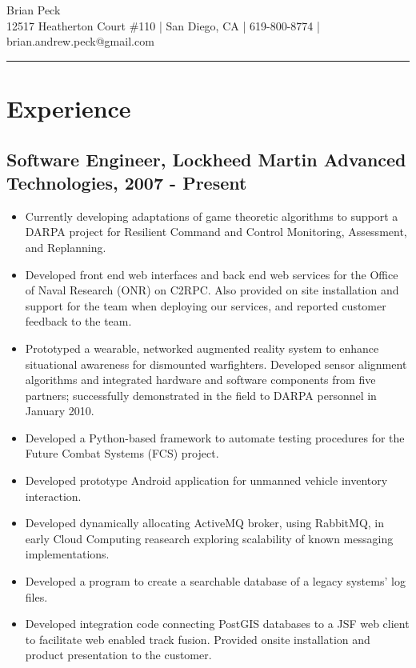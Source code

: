\documentclass[11pt]{article}
\title{}
\date{}
\begin{document}
\begin{center}
{\huge Brian Peck} \\
12517 Heatherton Court \#110 | San Diego, CA | 619-800-8774 | brian.andrew.peck@gmail.com
\hrule
\end{center}

\section*{Experience}
\label{sec-1}

\subsection*{Software Engineer, Lockheed Martin Advanced Technologies, 2007 - Present}
\label{sec-1.1}

\begin{itemize}
\item Currently developing adaptations of game theoretic algorithms to support a DARPA project for Resilient Command and Control Monitoring, Assessment, and Replanning.
\item Developed front end web interfaces and back end web services for the Office of Naval Research (ONR) on C2RPC. Also provided on site installation and support for the team when deploying our services, and reported customer feedback to the team.
\item Prototyped a wearable, networked augmented reality system to enhance situational awareness for dismounted warfighters.  Developed sensor alignment algorithms and integrated hardware and software components from five partners; successfully demonstrated in the field to DARPA personnel in January 2010.
\item Developed a Python-based framework to automate testing procedures for the Future Combat Systems (FCS) project.
\item Developed prototype Android application for unmanned vehicle inventory interaction.
\item Developed dynamically allocating ActiveMQ broker, using RabbitMQ, in early Cloud Computing reasearch exploring scalability of known messaging implementations.
\item Developed a program to create a searchable database of a legacy systems' log files.
\item Developed integration code connecting PostGIS databases to a JSF web client to facilitate web enabled track fusion. Provided onsite installation and product presentation to the customer.
\end{itemize}
\end{document}
